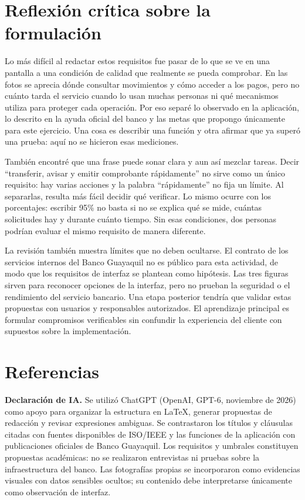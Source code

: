 \documentclass[conference,a4paper]{IEEEtran}
\begin{document}
\section{Reflexión crítica sobre la formulación}\label{sec:reflex}
Lo más difícil al redactar estos requisitos fue pasar de lo que se ve en una pantalla a una condición de calidad que realmente se pueda comprobar. En las fotos se aprecia dónde consultar movimientos y cómo acceder a los pagos, pero no cuánto tarda el servicio cuando lo usan muchas personas ni qué mecanismos utiliza para proteger cada operación. Por eso separé lo observado en la aplicación, lo descrito en la ayuda oficial del banco y las metas que propongo únicamente para este ejercicio. Una cosa es describir una función y otra afirmar que ya superó una prueba: aquí no se hicieron esas mediciones.

También encontré que una frase puede sonar clara y aun así mezclar tareas. Decir ``transferir, avisar y emitir comprobante rápidamente'' no sirve como un único requisito: hay varias acciones y la palabra ``rápidamente'' no fija un límite. Al separarlas, resulta más fácil decidir qué verificar. Lo mismo ocurre con los porcentajes: escribir 95\% no basta si no se explica qué se mide, cuántas solicitudes hay y durante cuánto tiempo. Sin esas condiciones, dos personas podrían evaluar el mismo requisito de manera diferente.

La revisión también muestra límites que no deben ocultarse. El contrato de los servicios internos del Banco Guayaquil no es público para esta actividad, de modo que los requisitos de interfaz se plantean como hipótesis. Las tres figuras sirven para reconocer opciones de la interfaz, pero no prueban la seguridad o el rendimiento del servicio bancario. Una etapa posterior tendría que validar estas propuestas con usuarios y responsables autorizados. El aprendizaje principal es formular compromisos verificables sin confundir la experiencia del cliente con supuestos sobre la implementación.

\section*{Referencias}
\printbibliography[heading=none]
\noindent\footnotesize\textbf{Declaración de IA.} Se utilizó ChatGPT (OpenAI, GPT-6, noviembre de 2026) como apoyo para organizar la estructura en LaTeX, generar propuestas de redacción y revisar expresiones ambiguas. Se contrastaron los títulos y cláusulas citadas con fuentes disponibles de ISO/IEEE y las funciones de la aplicación con publicaciones oficiales de Banco Guayaquil. Los requisitos y umbrales constituyen propuestas académicas: no se realizaron entrevistas ni pruebas sobre la infraestructura del banco. Las fotografías propias se incorporaron como evidencias visuales con datos sensibles ocultos; su contenido debe interpretarse únicamente como observación de interfaz.
\end{document}

